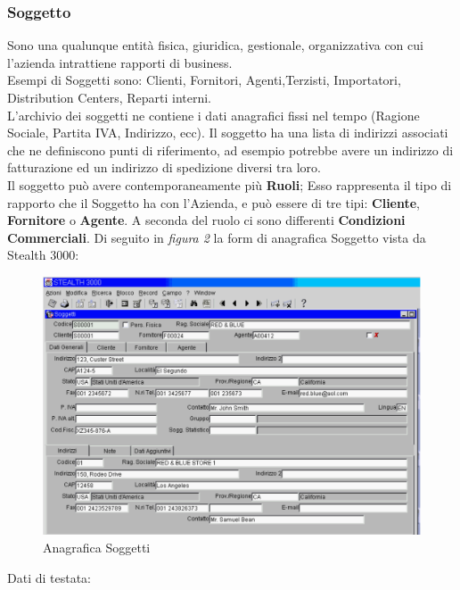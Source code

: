 \subsubsection{Soggetto}
Sono una qualunque entità fisica, giuridica, gestionale, organizzativa con cui l'azienda intrattiene rapporti di business.\\
Esempi di Soggetti sono: Clienti, Fornitori, Agenti,Terzisti, Importatori, Distribution Centers, Reparti interni.\\
L'archivio dei soggetti ne contiene i dati anagrafici fissi nel tempo (Ragione Sociale, Partita IVA, Indirizzo, ecc). Il soggetto ha una lista di indirizzi associati che ne definiscono punti di riferimento, ad esempio potrebbe avere un indirizzo di fatturazione ed un indirizzo di spedizione diversi tra loro.\\
Il soggetto può avere contemporaneamente più \textbf{Ruoli}; Esso rappresenta il tipo di rapporto che il Soggetto ha con l'Azienda, e può essere di tre tipi: \textbf{Cliente}, \textbf{Fornitore} o \textbf{Agente}. A seconda del ruolo ci sono differenti \textbf{Condizioni Commerciali}.
Di seguito in \textit{figura 2} la form di anagrafica Soggetto vista da Stealth 3000:
\newpage
\begin{figure}[!h]
\thispagestyle{empty}
\centering
\includegraphics[scale=0.45]{img/SogAnag.png}
\caption{Anagrafica Soggetti}
\end{figure}
\newpage
Dati di testata:
